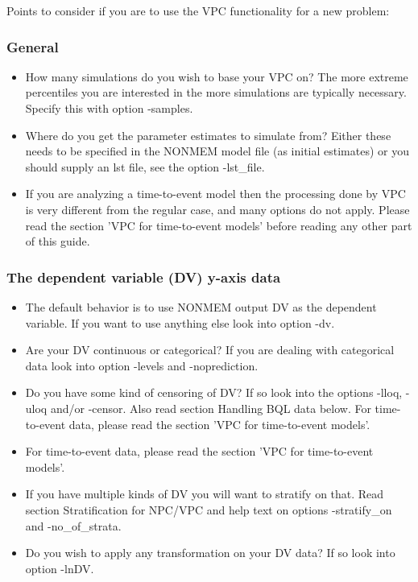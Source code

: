 Points to consider if you are to use the VPC functionality for a new problem:

\subsubsection*{General}

\begin{itemize}
	\item How many simulations do you wish to base your VPC on? The more extreme percentiles you are interested in the more simulations are typically necessary. Specify this with option -samples.
	\item Where do you get the parameter estimates to simulate from? Either these needs to be specified in the NONMEM model file (as initial estimates) or you should supply an lst file, see the option -lst\_file.
	\item If you are analyzing a time-to-event model then the processing done by VPC is very different from the regular case, and many options do not apply. Please read the section 'VPC for time-to-event models' before reading any other part of this guide.
\end{itemize}

\subsubsection*{The dependent variable (DV) y-axis data}

\begin{itemize}
	\item The default behavior is to use NONMEM output DV as the dependent variable. If you want to use anything else look into option -dv.
	\item Are your DV continuous or categorical? If you are dealing with categorical data look into option -levels and -noprediction.
	\item Do you have some kind of censoring of DV? If so look into the options -lloq, -uloq and/or -censor. Also read section Handling BQL data below. For time-to-event data, please read the section 'VPC for time-to-event models'.
	\item For time-to-event data, please read the section 'VPC for time-to-event models'.
	\item If you have multiple kinds of DV you will want to stratify on that. Read section Stratification for NPC/VPC and help text on options -stratify\_on and -no\_of\_strata.
	\item Do you wish to apply any transformation on your DV data? If so look into option -lnDV.
\end{itemize}

